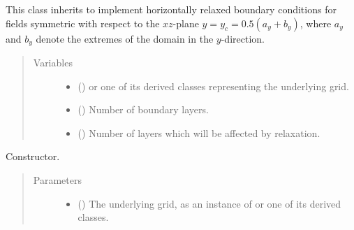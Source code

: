 \documentclass[letterpaper,10pt,english]{sphinxmanual}
\begin{document}
\begin{fulllineitems}
\label{\detokenize{api:dycore.horizontal_boundary_relaxed.RelaxedSymmetricXZ}}
This class inherits {\hyperref[\detokenize{api:dycore.horizontal_boundary_relaxed.Relaxed}]{}} to implement horizontally relaxed boundary conditions
for fields symmetric with respect to the \(xz\)-plane \(y = y_c = 0.5 (a_y + b_y)\),
where \(a_y\) and \(b_y\) denote the extremes of the domain in the \(y\)-direction.
\begin{quote}\begin{description}
\item[{Variables}] \leavevmode\begin{itemize}
\item {} 
 () \textendash{}  or one of its derived classes representing the underlying grid.

\item {} 
{\hyperref[\detokenize{api:dycore.prognostic_isentropic.PrognosticIsentropic.nb}]{}} () \textendash{} Number of boundary layers.

\item {} 
 () \textendash{} Number of layers which will be affected by relaxation.

\end{itemize}

\end{description}\end{quote}

\begin{fulllineitems}
\label{\detokenize{api:dycore.horizontal_boundary_relaxed.RelaxedSymmetricXZ.__init__}}
Constructor.
\begin{quote}\begin{description}
\item[{Parameters}] \leavevmode\begin{itemize}
\item {} 
 () \textendash{} The underlying grid, as an instance of {\hyperref[\detokenize{api:grids.grid_xyz.GridXYZ}]{}} or one of its derived classes.


\end{itemize}
\end{description}
\end{quote}
\end{fulllineitems}
\end{fulllineitems}
\end{document}
